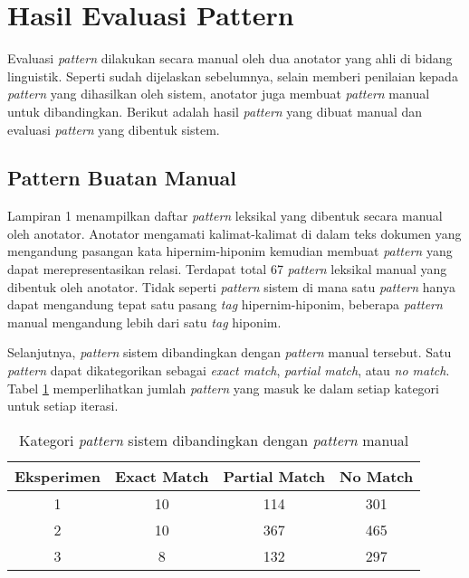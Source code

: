 \section{Hasil Evaluasi Pattern}
Evaluasi \textit{pattern} dilakukan secara manual oleh dua anotator yang ahli di bidang linguistik. Seperti sudah dijelaskan sebelumnya, selain memberi penilaian kepada \textit{pattern} yang dihasilkan oleh sistem, anotator juga membuat \textit{pattern} manual untuk dibandingkan. Berikut adalah hasil \textit{pattern} yang dibuat manual dan evaluasi \textit{pattern} yang dibentuk sistem.

\subsection{Pattern Buatan Manual}
Lampiran 1 menampilkan daftar \textit{pattern} leksikal yang dibentuk secara manual oleh anotator. Anotator mengamati kalimat-kalimat di dalam teks dokumen yang mengandung pasangan kata hipernim-hiponim kemudian membuat \textit{pattern} yang dapat merepresentasikan relasi. Terdapat total 67 \textit{pattern} leksikal manual yang dibentuk oleh anotator. Tidak seperti \textit{pattern} sistem di mana satu \textit{pattern} hanya dapat mengandung tepat satu pasang \textit{tag} hipernim-hiponim, beberapa \textit{pattern} manual mengandung lebih dari satu \textit{tag} hiponim.

Selanjutnya, \textit{pattern} sistem dibandingkan dengan \textit{pattern} manual tersebut. Satu \textit{pattern} dapat dikategorikan sebagai \textit{exact match}, \textit{partial match}, atau \textit{no match}. Tabel \ref{table:psis-kategori} memperlihatkan jumlah \textit{pattern} yang masuk ke dalam setiap kategori untuk setiap iterasi.

\begin{table}
  \centering
  \caption{Kategori \textit{pattern} sistem dibandingkan dengan \textit{pattern} manual}
  \label{table:psis-kategori}
  \begin{tabular}{|c|c|c|c|}
  \hline
  Eksperimen & Exact Match & Partial Match & No Match \\ \hline
  1 & 10 & 114 & 301 \\ \hline
  2 & 10 & 367 & 465 \\ \hline
  3 & 8 & 132 & 297 \\ \hline 
  \end{tabular} 
\end{table}

